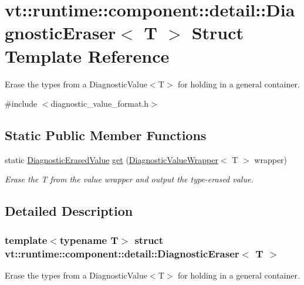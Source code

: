\hypertarget{structvt_1_1runtime_1_1component_1_1detail_1_1_diagnostic_eraser}{}\section{vt\+:\+:runtime\+:\+:component\+:\+:detail\+:\+:Diagnostic\+Eraser$<$ T $>$ Struct Template Reference}
\label{structvt_1_1runtime_1_1component_1_1detail_1_1_diagnostic_eraser}


Erase the types from a {\ttfamily Diagnostic\+Value$<$\+T$>$} for holding in a general container.  




{\ttfamily \#include $<$diagnostic\+\_\+value\+\_\+format.\+h$>$}

\subsection*{Static Public Member Functions}
\begin{DoxyCompactItemize}
\item 
static \hyperlink{structvt_1_1runtime_1_1component_1_1_diagnostic_erased_value}{Diagnostic\+Erased\+Value} \hyperlink{structvt_1_1runtime_1_1component_1_1detail_1_1_diagnostic_eraser_af09e0632083615511f10dd65b06e4781}{get} (\hyperlink{structvt_1_1runtime_1_1component_1_1detail_1_1_diagnostic_value_wrapper}{Diagnostic\+Value\+Wrapper}$<$ T $>$ wrapper)
\begin{DoxyCompactList}\small\item\em Erase the {\ttfamily T} from the value wrapper and output the type-\/erased value. \end{DoxyCompactList}\end{DoxyCompactItemize}


\subsection{Detailed Description}
\subsubsection*{template$<$typename T$>$\newline
struct vt\+::runtime\+::component\+::detail\+::\+Diagnostic\+Eraser$<$ T $>$}

Erase the types from a {\ttfamily Diagnostic\+Value$<$\+T$>$} for holding in a general container. 



